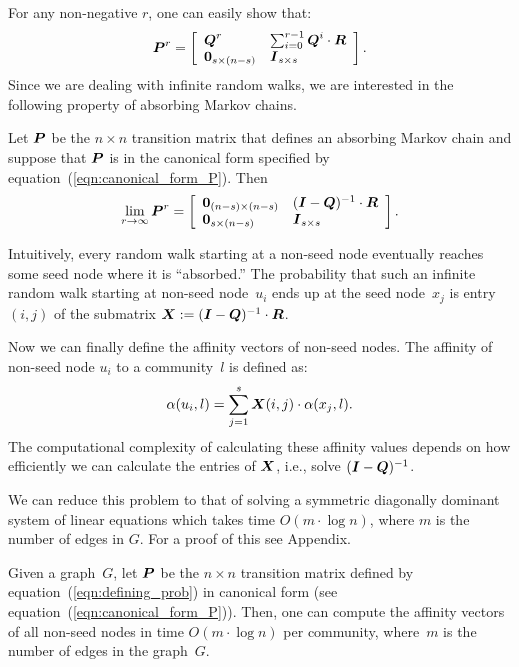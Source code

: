 For any non-negative $r$, one can easily show that:
\begin{equation}\label{exp:rth_product_of_P}
	\boldsymbol{P}^r = \left [ \begin{array}{ll}
						\boldsymbol{Q}^r  					& \sum_{i = 0}^{r - 1}\boldsymbol{Q}^i \cdot \boldsymbol{R} \\
						 \boldsymbol{0}_{s \times (n - s)} & \boldsymbol{I}_{s \times s}
						\end{array}
				\right ].
\end{equation}  
Since we are dealing with infinite random walks, we are interested in the following 
property of absorbing Markov chains.
\begin{proposition}\label{prop:limiting_Q}
	Let $\boldsymbol{P}$ be the $n \times n$ transition matrix that defines an absorbing Markov chain
	and suppose that $\boldsymbol{P}$ is in the canonical form specified by equation~(\ref{eqn:canonical_form_P}). 
	Then
    \begin{equation}
        \lim_{r \to \infty} \boldsymbol{P}^r = \left [ \begin{array}{ll}
            \boldsymbol{0}_{(n - s) \times (n - s)} & (\boldsymbol{I} - \boldsymbol{Q})^{-1} \cdot \boldsymbol{R} \\
            \boldsymbol{0}_{s \times (n - s)}       & \boldsymbol{I}_{s \times s}
        \end{array}
        \right ].
    \end{equation}  
\end{proposition}
Intuitively, every random walk starting at a non-seed node eventually 
reaches some seed node where it is ``absorbed.'' The probability 
that such an infinite random walk starting at non-seed node~$u_i$ ends 
up at the seed node~$x_j$ is entry $(i, j)$ of the 
submatrix $\boldsymbol{X} := (\boldsymbol{I} - \boldsymbol{Q})^{-1} \cdot \boldsymbol{R}$. 

Now we can finally define the affinity vectors of non-seed nodes.
The affinity of non-seed node $u_i$ to a community~$l$ is defined as:
\begin{equation}\label{eqn:belonging_vector}
    \alpha (u_i, l) = \sum_{j = 1}^{s} \boldsymbol{X} (i, j) \cdot \alpha (x_j, l).
\end{equation}
The computational complexity of calculating these affinity values  
depends on how efficiently we can calculate the entries of $\boldsymbol{X}$, 
i.e., solve $(\boldsymbol{I} - \boldsymbol{Q})^{-1}$. 

We can reduce this problem to that of solving a symmetric diagonally dominant 
system of linear equations which takes time $O(m \cdot \log n)$, where $m$
is the number of edges in $G$. For a proof of this see Appendix.  
\begin{theorem}\label{theorem:computing_NR}
Given a graph~$G$, let $\boldsymbol{P}$ be the $n \times n$ transition matrix 
defined by equation~(\ref{eqn:defining_prob}) in canonical form 
(see equation~(\ref{eqn:canonical_form_P})). Then, one can compute 
the affinity vectors of all non-seed nodes in time $O(m \cdot \log n)$ per community, 
where~$m$ is the number of edges in the graph~$G$.
\end{theorem}  



